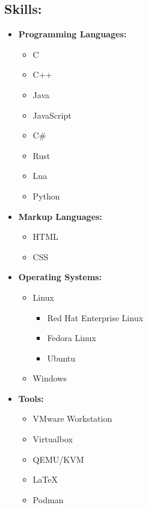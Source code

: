 \documentclass[12pt, oneside, a4paper]{article}
\begin{document}
\begin{paracol}{2}
    \begin{leftcolumn}
        \section*{Skills:}
    \begin{itemize}
    \scriptsize
    \item \textbf{Programming Languages:}
          \begin{itemize}
              \item C
              \item C++
              \item Java
              \item JavaScript
              \item C\#
              \item Rust
              \item Lua
              \item Python
          \end{itemize}
    \item \textbf{Markup Languages:}
    \begin{itemize}
        \item HTML
        \item CSS
    \end{itemize}
    \item \textbf{Operating Systems:}
          \begin{itemize}
              \item Linux
                \begin{itemize}
                    \item Red Hat Enterprise Linux
                    \item Fedora Linux
                    \item Ubuntu
                \end{itemize} 
              \item Windows
          \end{itemize}
    \item \textbf{Tools:}
          \begin{itemize}
              \item VMware Workstation
              \item Virtualbox
              \item QEMU/KVM
              \item \LaTeX
              \item Podman

\end{itemize}
\end{itemize}
\end{leftcolumn}
\end{paracol}
\end{document}
